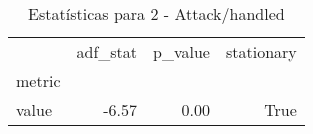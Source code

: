 \begin{table}[htbp]
\caption{Estatísticas para 2 - Attack/handled}
\label{tab:2_-_attack_handled_adf_test}
\begin{tabular}{lrrr}
\toprule
 & adf_stat & p_value & stationary \\
metric &  &  &  \\
\midrule
value & -6.57 & 0.00 & True \\
\bottomrule
\end{tabular}
\end{table}
